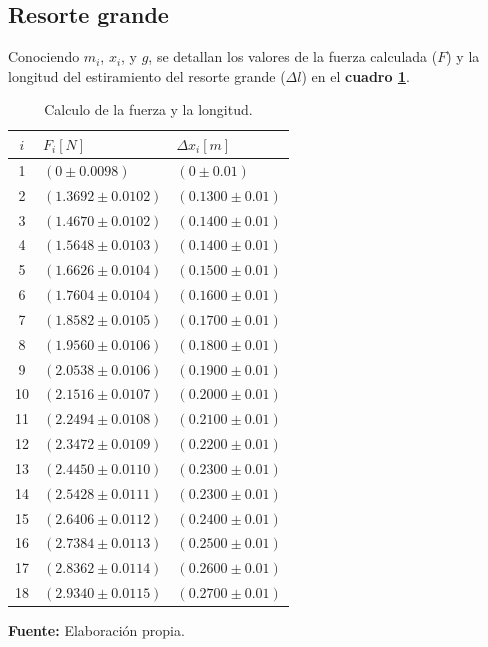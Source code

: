 \documentclass[letter,11pt]{article}
\newcommand{\source}[1]{\vspace{-11pt} \caption*{\small{\textbf{Fuente:} {#1}}}}
\begin{document}
\subsection{Resorte grande}
Conociendo $m_i$, $x_i$, y $g$, se detallan los valores de la fuerza calculada
($F$) y la longitud del estiramiento del resorte grande ($\Delta l$) en el
\textbf{cuadro \ref{cuadro4}}.

\begin{table}[!h]
\begin{center}
\begin{tabular}{|c|>{\centering}m{5.0cm}<{\centering}
                  |>{\centering}m{5.0cm}<{\centering}|}
\hline
$i$ & $F_i [N]$ & $\Delta x_i [m] $ \tabularnewline \hline
 1 & $(     0 \pm 0.0098)$ & $(     0 \pm 0.01)$ \tabularnewline \hline
 2 & $(1.3692 \pm 0.0102)$ & $(0.1300 \pm 0.01)$ \tabularnewline \hline
 3 & $(1.4670 \pm 0.0102)$ & $(0.1400 \pm 0.01)$ \tabularnewline \hline
 4 & $(1.5648 \pm 0.0103)$ & $(0.1400 \pm 0.01)$ \tabularnewline \hline
 5 & $(1.6626 \pm 0.0104)$ & $(0.1500 \pm 0.01)$ \tabularnewline \hline
 6 & $(1.7604 \pm 0.0104)$ & $(0.1600 \pm 0.01)$ \tabularnewline \hline
 7 & $(1.8582 \pm 0.0105)$ & $(0.1700 \pm 0.01)$ \tabularnewline \hline
 8 & $(1.9560 \pm 0.0106)$ & $(0.1800 \pm 0.01)$ \tabularnewline \hline
 9 & $(2.0538 \pm 0.0106)$ & $(0.1900 \pm 0.01)$ \tabularnewline \hline
10 & $(2.1516 \pm 0.0107)$ & $(0.2000 \pm 0.01)$ \tabularnewline \hline
11 & $(2.2494 \pm 0.0108)$ & $(0.2100 \pm 0.01)$ \tabularnewline \hline
12 & $(2.3472 \pm 0.0109)$ & $(0.2200 \pm 0.01)$ \tabularnewline \hline
13 & $(2.4450 \pm 0.0110)$ & $(0.2300 \pm 0.01)$ \tabularnewline \hline
14 & $(2.5428 \pm 0.0111)$ & $(0.2300 \pm 0.01)$ \tabularnewline \hline
15 & $(2.6406 \pm 0.0112)$ & $(0.2400 \pm 0.01)$ \tabularnewline \hline
16 & $(2.7384 \pm 0.0113)$ & $(0.2500 \pm 0.01)$ \tabularnewline \hline
17 & $(2.8362 \pm 0.0114)$ & $(0.2600 \pm 0.01)$ \tabularnewline \hline
18 & $(2.9340 \pm 0.0115)$ & $(0.2700 \pm 0.01)$ \tabularnewline \hline
\end{tabular}
\caption{Calculo de la fuerza y la longitud.}
\label{cuadro4}
\source{Elaboración propia.}
\end{center}
\end{table}
\end{document}
